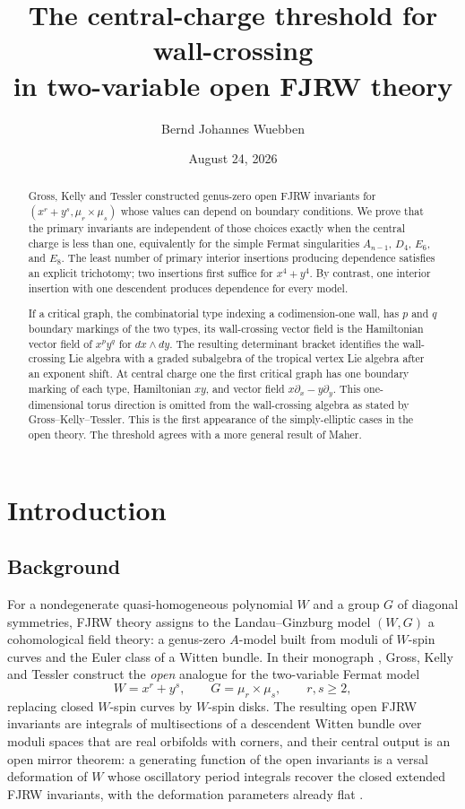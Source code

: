 \documentclass[11pt]{amsart}
\title[The central-charge threshold for wall-crossing in open FJRW theory]{The
central-charge threshold for wall-crossing\\ in two-variable open FJRW theory}
\author{Bernd Johannes Wuebben}
\date{August 24, 2026}
\theoremstyle{definition}
\theoremstyle{remark}
\begin{document}
\begin{abstract}
Gross, Kelly and Tessler constructed genus-zero open FJRW invariants for
$(x^r+y^s,\mu_r\times\mu_s)$ whose values can depend on boundary conditions.
We prove that the primary invariants are independent of those choices exactly
when the central charge is less than one, equivalently for the simple Fermat
singularities $A_{n-1}$, $D_4$, $E_6$, and $E_8$.  The least number of primary
interior insertions producing dependence satisfies an explicit trichotomy; two
insertions first suffice for $x^4+y^4$.  By contrast, one interior insertion
with one descendent produces dependence for every model.

If a critical graph, the combinatorial type indexing a codimension-one wall,
has $p$ and $q$ boundary markings of the two types, its
wall-crossing vector field is the Hamiltonian vector field of $x^p y^q$ for
$dx\wedge dy$.  The resulting determinant bracket identifies the
wall-crossing Lie algebra with a graded subalgebra of the tropical vertex Lie
algebra after an exponent shift.  At central charge one the first critical
graph has one boundary marking of each type, Hamiltonian $xy$, and vector field
$x\partial_x-y\partial_y$.  This one-dimensional torus direction is omitted from the
wall-crossing algebra as stated by Gross--Kelly--Tessler.  This is the first appearance of the
simply-elliptic cases in the open theory.  The threshold agrees with a more
general result of Maher.
\end{abstract}

\maketitle
\enlargethispage{3pt}

\section{Introduction}
\label{sec:intro}

\subsection*{Background}
For a nondegenerate quasi-homogeneous polynomial $W$ and a group $G$ of diagonal
symmetries, FJRW theory \cite{FJR13} assigns to the Landau--Ginzburg model
$(W,G)$ a cohomological field theory: a genus-zero $A$-model built from moduli
of $W$-spin curves and the Euler class of a Witten bundle. In their monograph
\cite{GKT}, Gross, Kelly and Tessler construct the \emph{open} analogue for the
two-variable Fermat model
\[
W=x^{r}+y^{s},\qquad G=\mu_{r}\times\mu_{s},\qquad r,s\geq 2,
\]
replacing closed $W$-spin curves by $W$-spin disks. The resulting open FJRW
invariants are integrals of multisections of a descendent Witten bundle over
moduli spaces that are real orbifolds with corners, and their central output is
an open mirror theorem: a generating function of the open invariants is a versal
deformation of $W$ whose oscillatory period integrals recover the closed
extended FJRW invariants, with the deformation parameters already flat
\cite[Theorem~0.3]{GKT}.
\end{document}
